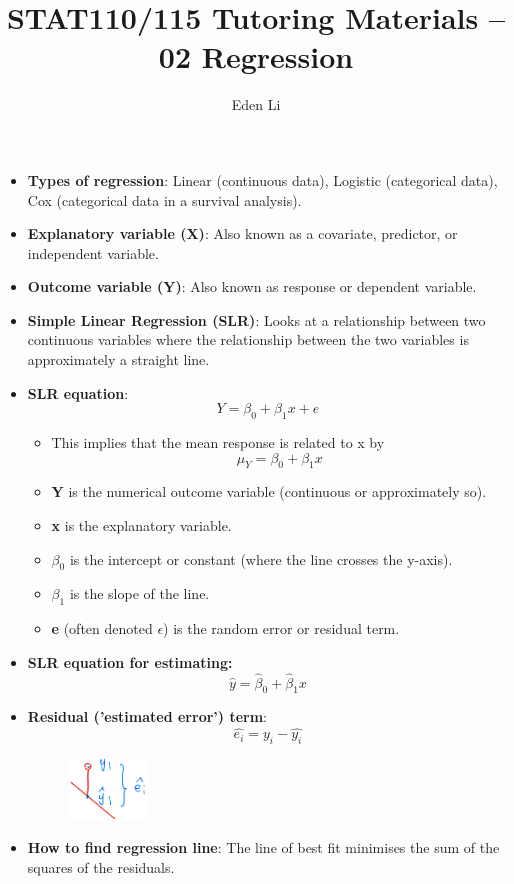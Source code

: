\documentclass[12pt]{article}
\author{Eden Li}
\title{STAT110/115 Tutoring Materials – 02 Regression}
\date{}
\begin{document}
\pagestyle{fancy}

\begin{itemize}
\item \textbf{Types of regression}: Linear (continuous data), Logistic (categorical data), Cox (categorical data in a survival analysis).
\item \textbf{Explanatory variable (X)}: Also known as a covariate, predictor, or independent variable.
\item \textbf{Outcome variable (Y)}: Also known as response or dependent variable.
\item \textbf{Simple Linear Regression (SLR)}: Looks at a relationship between two continuous variables where the relationship between the two variables is approximately a straight line.
\item \textbf{SLR equation}: $$Y = \beta_0 + \beta_1x + e$$
\begin{itemize}
\item This implies that the mean response is related to x by $$\mu_Y = \beta_0 + \beta_1x$$
\item \textbf{Y} is the numerical outcome variable (continuous or approximately so).
\item \textbf{x} is the explanatory variable.
\item \textbf{$\beta_0$} is the intercept or constant (where the line crosses the y-axis).
\item \textbf{$\beta_1$} is the slope of the line.
\item \textbf{e} (often denoted $\epsilon$) is the random error or residual term.
\end{itemize}
\item \textbf{SLR equation for estimating:}
$$\hat{y}=\hat{\beta}_0+\hat{\beta}_1x$$
\item \textbf{Residual ('estimated error') term}: $$\hat{e_i} = y_i - \hat{y_i}$$
\begin{figure}[H]
    \centering
    \includegraphics[width=0.2\textwidth]{92.png}
\end{figure}
\item \textbf{How to find regression line}: The line of best fit minimises the sum of the squares of the residuals.

\end{itemize}
\end{document}
